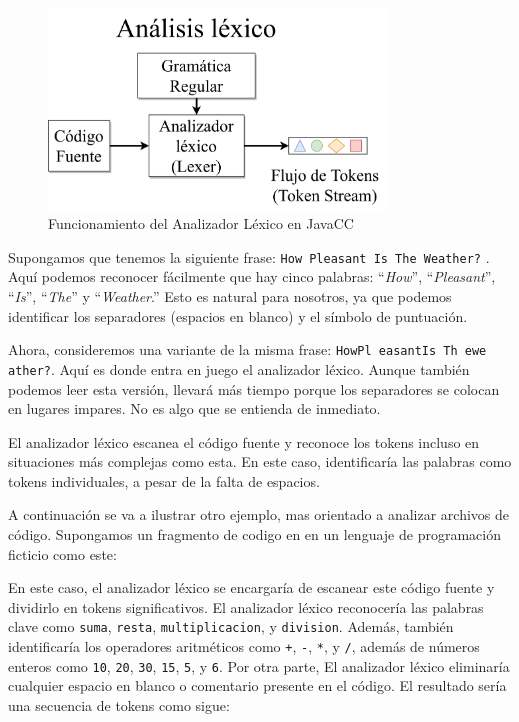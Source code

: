 \begin{figure}[H]
	\centering
	\includegraphics[width=0.8\textwidth]{imagenes/analizadorlexico.png}
	\caption{\label{fig:analizadorlexico}Funcionamiento del Analizador Léxico en JavaCC\cite{ytanalizadorlexico}}
\end{figure}

Supongamos que tenemos la siguiente frase: \lstinline|How Pleasant Is The Weather?| . Aquí podemos reconocer fácilmente que hay cinco palabras: “\textit{How}”, “\textit{Pleasant}”, “\textit{Is}”, “\textit{The}” y “\textit{Weather}.” Esto es natural para nosotros, ya que podemos identificar los separadores (espacios en blanco) y el símbolo de puntuación.

Ahora, consideremos una variante de la misma frase: \lstinline|HowPl easantIs Th ewe ather?|. Aquí es donde entra en juego el analizador léxico. Aunque también podemos leer esta versión, llevará más tiempo porque los separadores se colocan en lugares impares. No es algo que se entienda de inmediato.

El analizador léxico escanea el código fuente y reconoce los tokens incluso en situaciones más complejas como esta. En este caso, identificaría las palabras como tokens individuales, a pesar de la falta de espacios.

A continuación se va a ilustrar otro ejemplo, mas orientado a analizar archivos de código. Supongamos un fragmento de codigo en en un lenguaje de programación ficticio como este:

\lstset{inputencoding=utf8/latin1}


En este caso, el analizador léxico se encargaría de escanear este código fuente y dividirlo en tokens significativos. El analizador léxico reconocería las palabras clave como \lstinline|suma|, \lstinline|resta|, \lstinline|multiplicacion|, y \lstinline|division|. Además, también identificaría los operadores aritméticos como \lstinline|+|, \lstinline|-|,  \lstinline|*|, y  \lstinline|/|, además de números enteros como  \lstinline|10|,  \lstinline|20|,  \lstinline|30|,  \lstinline|15|,  \lstinline|5|, y \lstinline|6|. Por otra parte, El analizador léxico eliminaría cualquier espacio en blanco o comentario presente en el código. El resultado sería una secuencia de tokens como sigue:

